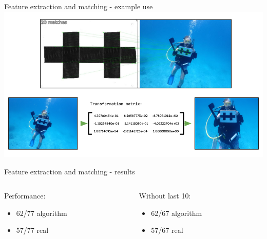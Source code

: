 \begin{frame}{Feature extraction and matching - example use}
    \centering
    \includegraphics[height=1.0\textheight,width=1.0\textwidth,keepaspectratio]{images/fs_homography_warped.png}
\end{frame}

\begin{frame}{Feature extraction and matching - results} 
    \begin{columns}
        \begin{column}{0.3\textwidth}
            Performance:
            \begin{itemize}
                \item 62/77 algorithm
                \item 57/77 real
            \end{itemize}
        \end{column}
        \begin{column}{0.3\textwidth}
            Without last 10:
            \begin{itemize}
                \item 62/67 algorithm
                \item 57/67 real
            \end{itemize}
        \end{column}
    \end{columns}
\end{frame}